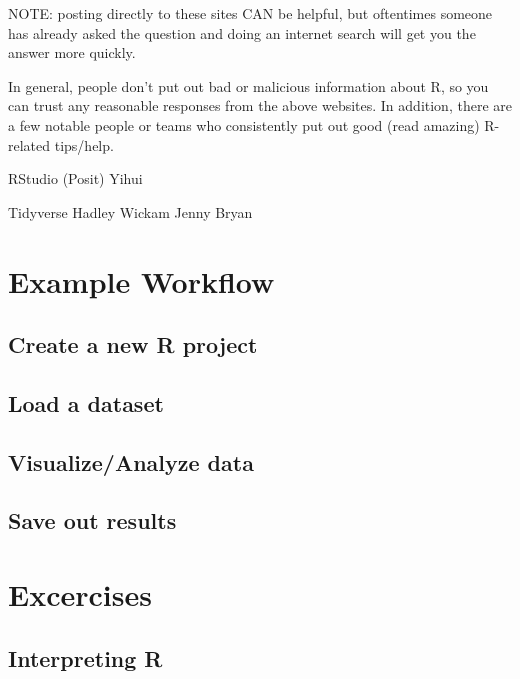 \documentclass[
]{book}
\begin{document}
NOTE: posting directly to these sites CAN be helpful, but oftentimes someone has already asked the question and doing an internet search will get you the answer more quickly.

In general, people don't put out bad or malicious information about R, so you can trust any reasonable responses from the above websites. In addition, there are a few notable people or teams who consistently put out good (read amazing) R-related tips/help.

RStudio (Posit)
Yihui

Tidyverse
Hadley Wickam
Jenny Bryan

\hypertarget{example-workflow}{%
\section*{Example Workflow}\label{example-workflow}}

\hypertarget{create-a-new-r-project}{%
\subsection{Create a new R project}\label{create-a-new-r-project}}

\hypertarget{load-a-dataset}{%
\subsection{Load a dataset}\label{load-a-dataset}}

\hypertarget{visualizeanalyze-data}{%
\subsection{Visualize/Analyze data}\label{visualizeanalyze-data}}

\hypertarget{save-out-results}{%
\subsection{Save out results}\label{save-out-results}}

\hypertarget{excercises}{%
\section*{Excercises}\label{excercises}}

\hypertarget{interpreting-r}{%
\subsection{Interpreting R}\label{interpreting-r}}
\end{document}
